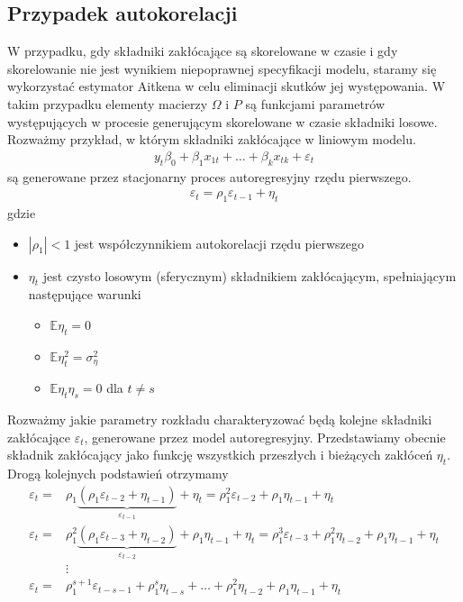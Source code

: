 \subsection{Przypadek autokorelacji}
W przypadku, gdy składniki zakłócające są skorelowane w czasie i gdy skorelowanie nie jest wynikiem niepoprawnej specyfikacji modelu, staramy się wykorzystać estymator Aitkena w celu eliminacji skutków jej występowania.
W takim przypadku elementy macierzy $ \Omega $ i $ P $ są funkcjami parametrów występujących w procesie generującym skorelowane w czasie składniki losowe. Rozważmy przykład, w którym składniki zakłócające w liniowym modelu.
\begin{gather*}
y_t\beta_{0}+\beta_{1}x_{1t}+\dots+\beta_kx_{tk}+\varepsilon_t
\end{gather*}
są generowane przez stacjonarny proces autoregresyjny rzędu pierwszego.
\begin{gather*}
\varepsilon_t=\rho _1\varepsilon_{t-1}+\eta_t
\end{gather*}
gdzie
\begin{itemize}
\item $ |\rho _1|<1 $ jest współczynnikiem autokorelacji rzędu pierwszego
\item $ \eta_t $ jest czysto losowym (sferycznym) składnikiem zakłócającym, spełniającym następujące warunki
\begin{itemize}
\item $ \mathbb E \eta_t=0 $
\item $ \mathbb E \eta^2_t=\sigma_\eta^2 $
\item $ \mathbb E \eta_t\eta_s=0 $ dla $ t\neq s $
\end{itemize}
\end{itemize}
Rozważmy jakie parametry rozkładu charakteryzować będą kolejne składniki zakłócające $ \varepsilon_t $, generowane przez model autoregresyjny. Przedstawiamy obecnie składnik zakłócający jako funkcję wszystkich przeszłych i bieżących zakłóceń $ \eta_t $. Drogą kolejnych podstawień otrzymamy
\begin{align*}
\varepsilon_t =&\rho _1\underbrace{\left(\rho _1\varepsilon_{t-2}+\eta_{t-1}\right)}_{\varepsilon_{t-1}}+\eta_t
=
\rho _1^2\varepsilon_{t-2}+\rho _1\eta_{t-1}+\eta_t \\
\varepsilon_t =&\rho _1^2\underbrace{\left(\rho _1\varepsilon_{t-3}+\eta_{t-2}\right)}_{\varepsilon_{t-2}}+\rho _1\eta_{t-1}+\eta_t
=
\rho _1^3\varepsilon_{t-3}+\rho _1^2\eta_{t-2}+\rho _1\eta_{t-1}+\eta_t
\\
& \vdots\\
\varepsilon_t =&\rho _1^{s+1}\varepsilon_{t-s-1}+\rho _1^{s}\eta_{t-s}+\dots +\rho _1^2\eta_{t-2}+\rho _1\eta_{t-1}+\eta_t
\end{align*}
